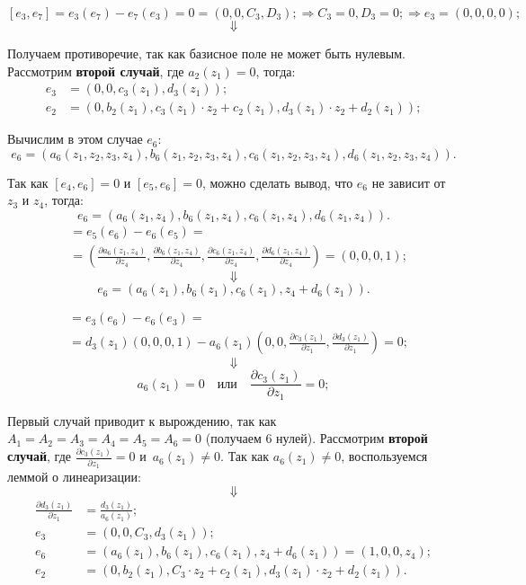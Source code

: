 \documentclass[12pt]{article}
\begin{document}
$$[e_3,e_7] = e_3(e_7) - e_7(e_3) = 0 = (0,0,C_3,D_3); \Rightarrow C_3 = 0, D_3 = 0; \Rightarrow e_3 = (0,0,0,0);$$
$$\Downarrow$$

Получаем противоречие, так как базисное поле не может быть нулевым. \\ 

Рассмотрим \textbf{второй случай}, где $a_2(z_1) = 0$, тогда: 
\begin{align*}
e_3 &= (0,0,c_3(z_1),d_3(z_1)); \\
e_2 &= (0, b_2(z_1), c_3(z_1) \cdot z_2 + c_2(z_1), d_3(z_1) \cdot z_2 + d_2(z_1));
\end{align*}

Вычислим в этом случае $e_6$:
$$e_6 = (a_6(z_1,z_2,z_3,z_4), b_6(z_1,z_2,z_3,z_4), c_6(z_1,z_2,z_3,z_4), d_6(z_1,z_2,z_3,z_4)).$$

Так как $[e_4,e_6] = 0 \text{ и } [e_5,e_6] = 0$, можно сделать вывод, что $e_6$ не зависит от $z_3 \text{ и } z_4$, тогда: 
$$e_6 = (a_6(z_1,z_4), b_6(z_1,z_4), c_6(z_1,z_4), d_6(z_1,z_4)).$$ 
\begin{align*}
[e_5,e_6] &= e_5(e_6) - e_6(e_5) = \\
&= \left(
\frac{\partial a_6(z_1,z_4)}{\partial z_4}, 
\frac{\partial b_6(z_1,z_4)}{\partial z_4}, 
\frac{\partial c_6(z_1,z_4)}{\partial z_4}, 
\frac{\partial d_6(z_1,z_4)}{\partial z_4}\right) = (0, 0, 0, 1);
\end{align*}
$$\Downarrow$$
$$e_6 = (a_6(z_1), b_6(z_1), c_6(z_1), z_4 + d_6(z_1)).$$

\begin{align*}
[e_3,e_6] &= e_3(e_6) - e_6(e_3) = \\
&= d_3(z_1)(0, 0, 0, 1) - a_6(z_1)\left(0,0,\frac{\partial c_3(z_1)}{\partial z_1}, \frac{\partial d_3(z_1)}{\partial z_1}\right) = 0;
\end{align*}
$$\Downarrow$$
$$a_6(z_1) = 0 \quad \text{или} \quad \frac{\partial c_3(z_1)}{\partial z_1} = 0;$$

Первый случай приводит к вырождению, так как $A_1 = A_2 = A_3 = A_4 = A_5 = A_6 = 0$ (получаем 6 нулей). Рассмотрим \textbf{второй случай}, где $\frac{\partial c_3(z_1)}{\partial z_1} = 0 \text{ и } \, a_6(z_1) \neq 0$. Так как $a_6(z_1) \neq 0$, воспользуемся леммой о линеаризации:
$$\Downarrow$$
\begin{align*}
\frac{\partial d_3(z_1)}{\partial z_1} &= \frac{d_3(z_1)}{a_6(z_1)}; \\
e_3 &= (0,0,C_3,d_3(z_1)); \\
e_6 &= (a_6(z_1), b_6(z_1), c_6(z_1), z_4 + d_6(z_1)) = (1, 0, 0, z_4); \\ 
e_2 &= (0, b_2(z_1), C_3 \cdot z_2 + c_2(z_1), d_3(z_1) \cdot z_2 + d_2(z_1)). 
\end{align*}
\end{document}
